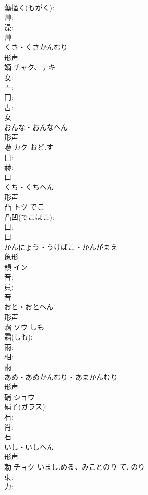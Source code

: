 \documentclass[8pt]{extreport}
\begin{document}
\begin{CJK}{UTF8}{min}
\\	藻掻く(もがく): 
\\	艸: 
\\	澡: 
\\	艸	
\\	くさ・くさかんむり	
\\	形声 
\\	嫡	チャク、テキ			
\\	女: 
\\	亠: 
\\	冂: 
\\	古: 
\\	女	
\\	おんな・おんなへん	
\\	形声 
\\	嚇	カク	おど.す		
\\	口: 
\\	赫: 
\\	口	
\\	くち・くちへん	
\\	形声 
\\	凸	トツ	でこ		
\\	凸凹(でこぼこ): 
\\	凵: 
\\	凵	
\\	かんにょう・うけばこ・かんがまえ	
\\	象形 
\\	韻	イン			
\\	音: 
\\	員: 
\\	音	
\\	おと・おとへん	
\\	形声 
\\	霜	ソウ	しも		
\\	霜(しも): 
\\	雨: 
\\	相: 
\\	雨	
\\	あめ・あめかんむり・あまかんむり	
\\	形声 
\\	硝	ショウ			
\\	硝子(ガラス): 
\\	石: 
\\	肖: 
\\	石	
\\	いし・いしへん	
\\	形声 
\\	勅	チョク	いまし.める、みことのり	て, のり	
\\	束: 
\\	力: 

\end{CJK}
\end{document}
